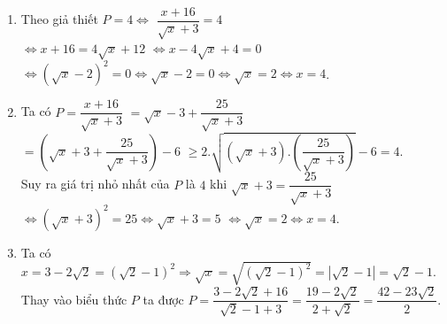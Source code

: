 \begin{bt}
{\begin{enumerate}
				$ \begin{aligned} P &=\dfrac{x\sqrt{x}+26\sqrt{x}-19}{x+2\sqrt{x}-3}-\dfrac{2\sqrt{x}}{\sqrt{x}-1}+\dfrac{\sqrt{x}-3}{\sqrt{x}+3}=\dfrac{x\sqrt{x}+26\sqrt{x}-19}{\left(\sqrt{x}-1\right)\left(\sqrt{x}+3\right)}-\dfrac{2\sqrt{x}}{\sqrt{x}-1}+\dfrac{\sqrt{x}-3}{\sqrt{x}+3}\\
				&=\dfrac{x\sqrt{x}+26\sqrt{x}-19-2\sqrt{x}\left(\sqrt{x}+3\right)+\left(\sqrt{x}-3\right)\left(\sqrt{x}-1\right)}{\left(\sqrt{x}-1\right)\left(\sqrt{x}+3\right)}\\
				&=\dfrac{x\sqrt{x}+26\sqrt{x}-19-2x-6\sqrt{x}+x-4\sqrt{x}+3}{\left(\sqrt{x}-1\right)\left(\sqrt{x}+3\right)}\\
				&=\dfrac{x\sqrt{x}-x+16\sqrt{x}-16}{\left(\sqrt{x}-1\right)\left(\sqrt{x}+3\right)} \\
				&=\dfrac{x\left(\sqrt{x}-1\right)+16\left(\sqrt{x}-1\right)}{\left(\sqrt{x}-1\right)\left(\sqrt{x}+3\right)}\\
				&=\dfrac{\left(\sqrt{x}-1\right)\left(x+16\right)}{\left(\sqrt{x}-1\right)\left(\sqrt{x}+3\right)}\\
				&=\dfrac{x+16}{\sqrt{x}+3} \end{aligned}$.\\
				Vậy $P$$=\dfrac{x+16}{\sqrt{x}+3}$.
				\item Theo giả thiết $P=4\Leftrightarrow $
				$\dfrac{x+16}{\sqrt{x}+3}=4$\\
				$\Leftrightarrow x+16=4\sqrt{x}+12$
				$\Leftrightarrow x-4\sqrt{x}+4=0$\\
				$\Leftrightarrow {\left(\sqrt{x}-2\right)}^2=0\Leftrightarrow \sqrt{x}-2=0\Leftrightarrow \sqrt{x}=2\Leftrightarrow x=4$.
				\item Ta có $P=\dfrac{x+16}{\sqrt{x}+3}$
				$=\sqrt{x}-3+\dfrac{25}{\sqrt{x}+3}$\\
				$=\left(\sqrt{x}+3+\dfrac{25}{\sqrt{x}+3}\right)-6$
				$\ge 2.\sqrt{\left(\sqrt{x}+3\right).\left(\dfrac{25}{\sqrt{x}+3}\right)}-6=4$.\\
				Suy ra giá trị nhỏ nhất của $P$ là $4$ khi $\sqrt{x}+3=\dfrac{25}{\sqrt{x}+3}$$\Leftrightarrow {\left(\sqrt{x}+3\right)}^2=25$$\Leftrightarrow \sqrt{x}+3=5$
				$\Leftrightarrow \sqrt{x}=2\Leftrightarrow x=4$.
				\item Ta có $x=3-2\sqrt{2}={\left(\sqrt{2}-1\right)}^2\Rightarrow \sqrt{x}=\sqrt{{\left(\sqrt{2}-1\right)}^2}=\left| \sqrt{2}-1\right|=\sqrt{2}-1$.\\
				Thay vào biểu thức $P$ ta được $P=\dfrac{3-2\sqrt{2}+16}{\sqrt{2}-1+3}=\dfrac{19-2\sqrt{2}}{2+\sqrt{2}}=\dfrac{42-23\sqrt{2}}{2}$.
			\end{enumerate}
		}
	\end{bt}
	
